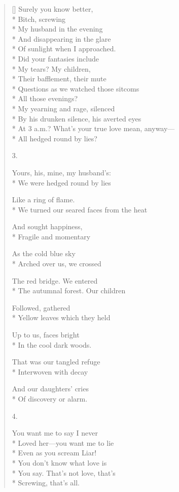 \begin{verse}[\versewidth]
Surely you know better,\\*
Bitch, screwing\\*
My husband in the evening \\*
And disappearing in the glare\\*
Of sunlight when I approached. \\*
Did your fantasies include\\*
My tears?  My children, \\*
Their bafflement, their mute\\*
Questions as we watched those sitcoms\\*
All those evenings?\\*
My yearning and rage, silenced\\*
By his drunken silence, his averted eyes\\*
At 3 a.m.? What's your true love mean, anyway---\\*
All hedged round by lies?

3.

Yours, his, mine, my husband's:\\*
We were hedged round by lies

Like a ring of flame.\\*
We turned our seared faces from the heat

And sought happiness, \\*
Fragile and momentary

As the cold blue sky\\*
Arched over us, we crossed

The red bridge. We entered\\*
The autumnal forest. Our children

Followed, gathered\\*
Yellow leaves which they held

Up to us, faces bright\\*
In the cool dark woods.

That was our tangled refuge\\*
Interwoven with decay

And our daughters' cries\\*
Of discovery or alarm.

4.

You want me to say I never \\*
Loved her---you want me to lie\\*
Even as you scream Liar!\\*
You don't know what love is\\*
You say. That's not love, that's\\*
Screwing, that's all.


\end{verse}
